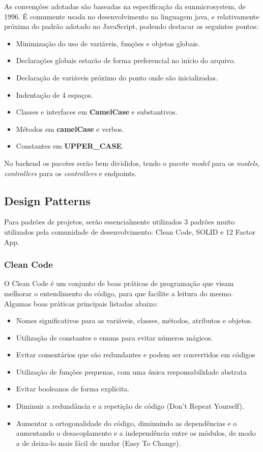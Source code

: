 As convenções adotadas são baseadas na especificação da \gls{sunmicrosystem}, de 1996. É comumente usada no desenvolvimento na linguagem java, e relativamente próxima do padrão adotado no JavaScript, podendo destacar os seguintes pontos:

\begin{itemize}
    \item Minimização do uso de variáveis, funções e objetos globais.
    \item Declarações globais estarão de forma preferencial no início do arquivo.
    \item Declaração de variáveis próximo do ponto onde são inicializadas.
    \item Indentação de 4 espaços.
    \item Classes e interfaces em \textbf{CamelCase} e substantivos.
    \item Métodos em \textbf{camelCase} e verbos.
    \item Constantes em \textbf{UPPER\_CASE}.
\end{itemize}

No \gls{backend} os pacotes serão bem divididos, tendo o pacote \emph{model} para os \emph{models}, \emph{controllers} para os \emph{controllers} e \glspl{endpoint}. 

\subsection{Design Patterns}
Para padrões de projetos, serão essencialmente utilizados 3 padrões muito utilizados pela comunidade de desenvolvimento: Clean Code, SOLID e 12 Factor App.

\subsubsection{Clean Code}
O Clean Code é um conjunto de boas práticas de programação que visam melhorar o entendimento do código, para que facilite a leitura do mesmo. Algumas boas práticas principais listadas abaixo:

\begin{itemize}
    \item Nomes significativos para as variáveis, classes, métodos, atributos e objetos.
    \item Utilização de constantes e enums para evitar números mágicos.
    \item Evitar comentários que são redundantes e podem ser convertidos em códigos
    \item Utilização de funções pequenas, com uma única responsabilidade abstrata
    \item Evitar booleanos de forma explícita.
    \item Diminuir a redundância e a repetição de código (Don't Repeat Yourself).
    \item Aumentar a ortogonalidade do código, diminuindo as dependências e o aumentando o desacoplamento e a independência entre os módulos, de modo a de deixa-lo mais fácil de mudar (Easy To Change).
\end{itemize}


